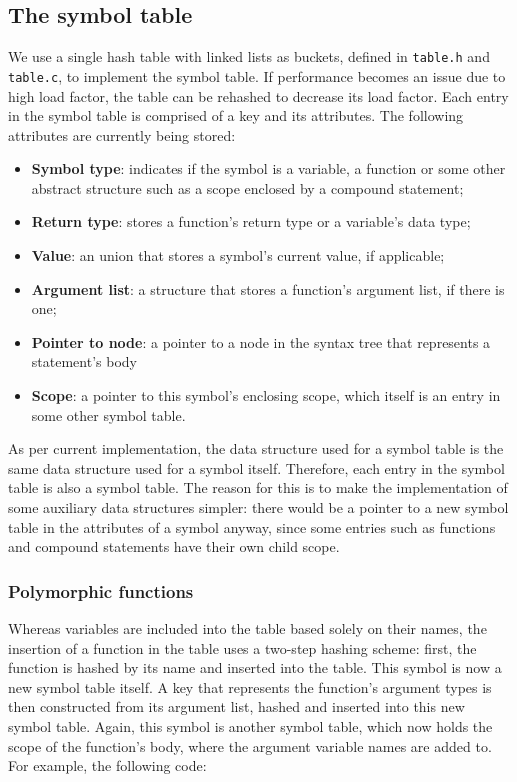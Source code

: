 
\subsection{The symbol table}
We use a single hash table with linked lists as buckets, defined in \texttt{table.h} and
\texttt{table.c}, to implement the symbol table. If performance becomes an issue due to high
load factor, the table can be rehashed to decrease its load factor. Each entry in the symbol
table is comprised of a key and its attributes. The following attributes are currently being
stored:

\begin{itemize}
 \item \textbf{Symbol type}: indicates if the symbol is a variable, a function or some other abstract
 structure such as a scope enclosed by a compound statement;
 \item \textbf{Return type}: stores a function's return type or a variable's data type;
 \item \textbf{Value}: an union that stores a symbol's current value, if applicable;
 \item \textbf{Argument list}: a structure that stores a function's argument list, if there is one;
 \item \textbf{Pointer to node}: a pointer to a node in the syntax tree that represents a statement's body
 \item \textbf{Scope}: a pointer to this symbol's enclosing scope, which itself is an entry in
 some other symbol table.
\end{itemize}

As per current implementation, the data structure used for a symbol table is the same
data structure used for a symbol itself. Therefore, each entry in the symbol table is also a
symbol table. The reason for this is to make the implementation of some auxiliary data structures
simpler: there would be a pointer to a new symbol table in the attributes of a symbol anyway, since
some entries such as functions and compound statements have their own child scope.

\subsubsection{Polymorphic functions}

Whereas variables are included into the table based solely on their names, the insertion of
a function in the table uses a two-step hashing scheme: first, the function is hashed by its
name and inserted into the table. This symbol is now a new symbol table itself.
A key that represents the function's argument types is then constructed from its argument list,
hashed and inserted into this new symbol table. Again, this symbol is another symbol table,
which now holds the scope of the function's body, where the argument variable names are added
to. For example, the following code:

